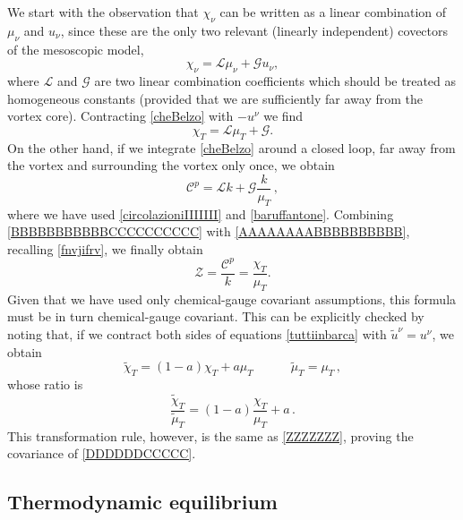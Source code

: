 \documentclass[preprints,article,accept,moreauthors,pdftex]{mdpi}
\newcommand{\spc}{\quad \quad \quad}
\begin{document}
We start with the observation that $\chi_\nu$ can be written as a linear combination of $\mu_\nu$ and $u_\nu$, since these are the only two relevant (linearly independent) covectors of the mesoscopic model,
\begin{equation}\label{cheBelzo}
    \chi_\nu = \mathcal{L} \mu_\nu + \mathcal{G} u_\nu,
\end{equation}
where $\mathcal{L}$ and $\mathcal{G}$ are two linear combination coefficients which should be treated as homogeneous constants (provided that we are sufficiently far away from the vortex core). Contracting \eqref{cheBelzo} with $-u^\nu$ we find
\begin{equation}\label{AAAAAAAABBBBBBBBBB}
    \chi_T = \mathcal{L} \mu_T + \mathcal{G}.
\end{equation}
On the other hand, if we integrate \eqref{cheBelzo} around a closed loop, far away from the vortex and surrounding the vortex only once, we obtain
\begin{equation}\label{BBBBBBBBBBBCCCCCCCCCC}
    \mathcal{C}^p = \mathcal{L}k + \mathcal{G} \dfrac{k}{\mu_T} \, ,
\end{equation}
where we have used \eqref{circolazioniIIIIIII} and \eqref{baruffantone}. Combining \eqref{BBBBBBBBBBBCCCCCCCCCC} with \eqref{AAAAAAAABBBBBBBBBB}, recalling \eqref{fnvjifrv}, we finally obtain 
\begin{equation}\label{DDDDDDCCCCC}
    \mathcal{Z} = \dfrac{\mathcal{C}^p}{k} =\dfrac{\chi_T}{\mu_T} .
\end{equation}
Given that we have used only chemical-gauge covariant assumptions, this formula must be in turn chemical-gauge covariant. This can be explicitly checked by noting that, if we contract both sides of equations \eqref{tuttiinbarca} with $\tilde{u}^\nu = u^\nu$, we obtain
\begin{equation}
\tilde{\chi}_T = (1-a)\chi_T + a \mu_T  \spc  \tilde{\mu}_T = \mu_T
\, ,
\end{equation}
whose ratio is
\begin{equation}
    \dfrac{\tilde{\chi}_T}{\tilde{\mu}_T} = (1-a) \dfrac{\chi_T}{\mu_T} + a \, .
\end{equation}
This transformation rule, however, is the same as \eqref{ZZZZZZZ}, proving the covariance of \eqref{DDDDDDCCCCC}.




\subsection{Thermodynamic equilibrium}\label{riGGG}
\end{document}
